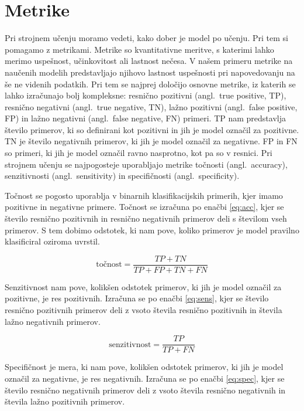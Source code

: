 \documentclass[a4paper, 12pt, openright]{book}
\newcommand{\en}{angl.}
\begin{document}
\section{Metrike}

Pri strojnem učenju moramo vedeti, kako dober je model po učenju.
Pri tem si pomagamo z metrikami.
Metrike so kvantitativne meritve, s katerimi lahko merimo uspešnost, učinkovitost ali lastnost nečesa.
V našem primeru metrike na naučenih modelih predstavljajo njihovo lastnost uspešnosti pri napovedovanju na še ne videnih podatkih.
Pri tem se najprej določijo osnovne metrike, iz katerih se lahko izračunajo bolj kompleksne: resnično pozitivni (\en\ true positive, TP), resnično negativni (\en\ true negative, TN), lažno pozitivni (\en\ false positive, FP) in lažno negativni (\en\ false negative, FN) primeri.
TP nam predstavlja število primerov, ki so definirani kot pozitivni in jih je model označil za pozitivne.
TN je število negativnih primerov, ki jih je model označil za negativne.
FP in FN so primeri, ki jih je model označil ravno nasprotno, kot pa so v resnici.
Pri strojnem učenju se najpogosteje uporabljajo metrike točnosti (\en\ accuracy), senzitivnosti (\en\ sensitivity) in specifičnosti (\en\ specificity).


Točnost se pogosto uporablja v binarnih klasifikacijskih primerih, kjer imamo pozitivne in negativne primere.
Točnost se izračuna po enačbi \ref{eq:acc}, kjer se število resnično pozitivnih in resnično negativnih primerov deli s številom vseh primerov.
S tem dobimo odstotek, ki nam pove, koliko primerov je model pravilno klasificiral oziroma uvrstil.

\begin{equation}
\label{eq:acc}
    \text{točnost} = \frac{TP+TN}{TP+FP+TN+FN}
\end{equation}

Senzitivnost nam pove, kolikšen odstotek primerov, ki jih je model označil za pozitivne, je res pozitivnih.
Izračuna se po enačbi \ref{eq:sens}, kjer se število resnično pozitivnih primerov deli z vsoto števila resnično pozitivnih in števila lažno negativnih primerov.

\begin{equation}
\label{eq:sens}
    \text{senzitivnost} = \frac{TP}{TP+FN}
\end{equation}

Specifičnost je mera, ki nam pove, kolikšen odstotek primerov, ki jih je model označil za negativne, je res negativnih.
Izračuna se po enačbi \ref{eq:spec}, kjer se število resnično negativnih primerov deli z vsoto števila resnično negativnih in števila lažno pozitivnih primerov.
\end{document}
